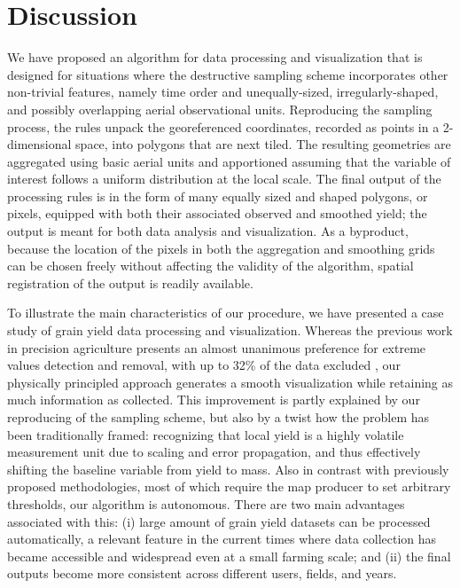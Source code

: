 \chapter{Discussion}

 We have proposed an algorithm
for data processing and visualization that is designed for situations
where the destructive sampling scheme incorporates other non-trivial
features, namely time order and unequally-sized, irregularly-shaped,
and possibly overlapping aerial observational units. Reproducing the
sampling process, the rules unpack the georeferenced coordinates,
recorded as points in a 2-dimensional space, into polygons that are
next tiled. The resulting geometries are aggregated using basic aerial
units and apportioned assuming that the variable of interest follows a
uniform distribution at the local scale. The final output of the
processing rules is in the form of many equally sized and shaped
polygons, or pixels, equipped with both their associated observed and
smoothed yield; the output is meant for both data analysis and
visualization. As a byproduct, because the location of the pixels in
both the aggregation and smoothing grids can be chosen freely without
affecting the validity of the algorithm, spatial registration of the
output is readily available.

 To illustrate the main
characteristics of our procedure, we have presented a case study of
grain yield data processing and visualization. Whereas the previous
work in precision agriculture presents an almost unanimous preference
for extreme values detection and removal, with up to 32\% of the data
excluded \cite{Lyle2013}, our physically principled approach generates
a smooth visualization while retaining as much information as
collected. This improvement is partly explained by our reproducing of
the sampling scheme, but also by a twist how the problem has been
traditionally framed: recognizing that local yield is a highly
volatile measurement unit due to scaling and error propagation, and
thus effectively shifting the baseline variable from yield to
mass. Also in contrast with previously proposed methodologies, most of
which require the map producer to set arbitrary thresholds, our
algorithm is autonomous. There are two main advantages associated with
this: (i) large amount of grain yield datasets can be processed
automatically, a relevant feature in the current times where data
collection has became accessible and widespread even at a small
farming scale; and (ii) the final outputs become more consistent
across different users, fields, and years.

